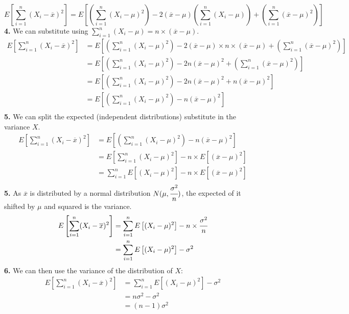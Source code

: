 \documentclass{report}
\begin{document}
\[E\left[ \sum_{i = 1}^n ( X_i - \overline{x} )^2 \right] = E\left[ \left( \sum_{i = 1}^n (X_i - \mu)^2 \right) - 2(\overline{x} - \mu)\left( \sum_{i = 1}^n (X_i - \mu) \right) + \left( \sum_{i = 1}^n(\overline{x} - \mu)^2 \right) \right]\]
\textbf{4. } We can substitute using $\sum_{i = 1}^n (X_i - \mu) = n \times (\overline{x} - \mu)$.
\[\begin{split}
		E\left[ \sum_{i = 1}^n ( X_i - \overline{x} )^2 \right] &= E\left[ \left( \sum_{i = 1}^n (X_i - \mu)^2 \right) - 2(\overline{x} - \mu) \times n \times (\overline{x} - \mu) + \left( \sum_{i = 1}^n(\overline{x} - \mu)^2 \right) \right] \\
		&= E\left[ \left( \sum_{i = 1}^n (X_i - \mu)^2 \right) - 2n(\overline{x} - \mu)^2 + \left( \sum_{i = 1}^n(\overline{x} - \mu)^2 \right) \right] \\
		&= E\left[ \left( \sum_{i = 1}^n (X_i - \mu)^2 \right) - 2n(\overline{x} - \mu)^2 + n(\overline{x} - \mu)^2 \right] \\
		&= E\left[ \left( \sum_{i = 1}^n (X_i - \mu)^2 \right) - n(\overline{x} - \mu)^2 \right] \\
	\end{split}\]
\textbf{5. } We can split the expected (independent distributions) substitute in the variance $X$.
\[\begin{split}
		E\left[ \sum_{i = 1}^n ( X_i - \overline{x} )^2 \right] &= E\left[ \left( \sum_{i = 1}^n (X_i - \mu)^2 \right) - n(\overline{x} - \mu)^2 \right] \\
		&= E \left[ \sum_{i = 1}^n (X_i - \mu)^2 \right] - n \times E\left[ \left( \overline{x} - \mu \right)^2 \right]\\
		&= \sum_{i = 1}^n E\left[ (X_i - \mu)^2 \right] - n \times E\left[ \left( \overline{x} - \mu \right)^2 \right]\\
	\end{split}\]
\textbf{5. } As $\overline{x}$ is distributed by a normal distribution $N(\mu, \cfrac{\sigma^2}{n})$, the expected of it shifted by $\mu$ and squared is the variance.
\[\begin{split}
		E\left[ \sum_{i = 1}^n ( X_i - \overline{x} )^2 \right] &= \sum_{i = 1}^n E\left[ (X_i - \mu)^2 \right] - n \times \cfrac{\sigma^2}{n}\\
		&= \sum_{i = 1}^n E\left[ (X_i - \mu)^2 \right] - \sigma^2\\
	\end{split}\]
\textbf{6. } We can then use the variance of the distribution of $X$:
\[\begin{split}
		E\left[ \sum_{i = 1}^n ( X_i - \overline{x} )^2 \right] &= \sum_{i = 1}^n E\left[ (X_i - \mu)^2 \right] - \sigma^2\\
		&= n \sigma^2 - \sigma^2\\
		&= (n - 1) \sigma^2\\
	\end{split}\]
\end{document}
